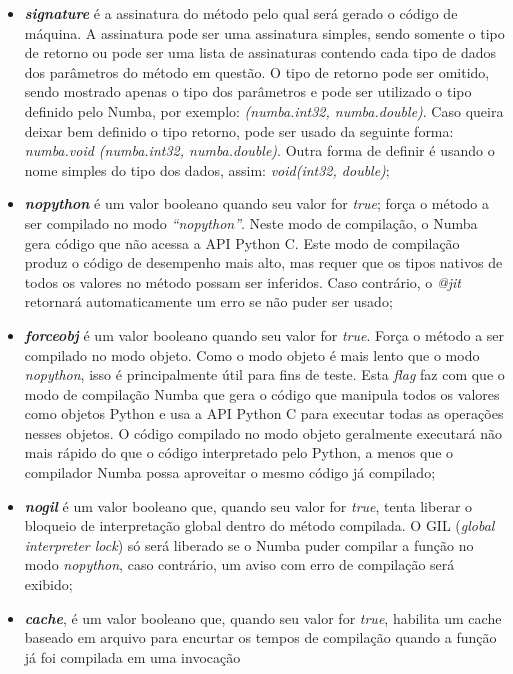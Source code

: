 \documentclass[
	12pt,				%
	twoside,			%
	a4paper,			%
	english,			%
	french,				%
	spanish,			%
	brazil				%
	]{abntex2}
\begin{document}
\begin{itemize}
\item
  \textbf{\emph{signature}} é a assinatura do método pelo qual será
  gerado o código de máquina. A assinatura pode ser uma assinatura
  simples, sendo somente o tipo de retorno ou pode ser uma lista de
  assinaturas contendo cada tipo de dados dos parâmetros do método em
  questão. O tipo de retorno pode ser omitido, sendo mostrado apenas o
  tipo dos parâmetros e pode ser utilizado o tipo definido pelo Numba,
  por exemplo: \emph{(numba.int32, numba.double)}. Caso queira deixar
  bem definido o tipo retorno, pode ser usado da seguinte forma:
  \emph{numba.void (numba.int32, numba.double)}. Outra forma de definir
  é usando o nome simples do tipo dos dados, assim: \emph{void(int32,
  double)};
\item
  \textbf{\emph{nopython}} é um valor booleano quando seu valor for
  \emph{true}; força o método a ser compilado no modo
  \emph{``nopython''}. Neste modo de compilação, o Numba gera código que
  não acessa a API Python C. Este modo de compilação produz o código de
  desempenho mais alto, mas requer que os tipos nativos de todos os
  valores no método possam ser inferidos. Caso contrário, o \emph{@jit}
  retornará automaticamente um erro se não puder ser usado;
\item
  \textbf{\emph{forceobj}} é um valor booleano quando seu valor for
  \emph{true}. Força o método a ser compilado no modo objeto. Como o
  modo objeto é mais lento que o modo \emph{nopython}, isso é
  principalmente útil para fins de teste. Esta \emph{flag} faz com que o
  modo de compilação Numba que gera o código que manipula todos os
  valores como objetos Python e usa a API Python C para executar todas
  as operações nesses objetos. O código compilado no modo objeto
  geralmente executará não mais rápido do que o código interpretado pelo
  Python, a menos que o compilador Numba possa aproveitar o mesmo código
  já compilado;
\item
  \textbf{\emph{nogil}} é um valor booleano que, quando seu valor for
  \emph{true}, tenta liberar o bloqueio de interpretação global dentro
  do método compilada. O GIL (\emph{global interpreter lock}) só será
  liberado se o Numba puder compilar a função no modo \emph{nopython},
  caso contrário, um aviso com erro de compilação será exibido;
\item
  \textbf{\emph{cache}}, é um valor booleano que, quando seu valor for
  \emph{true}, habilita um cache baseado em arquivo para encurtar os
  tempos de compilação quando a função já foi compilada em uma invocação

\end{itemize}
\end{document}
